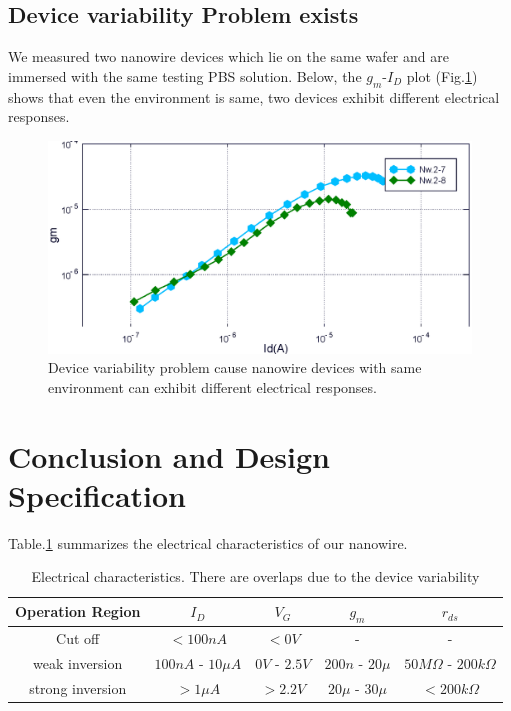 \subsection{Device variability Problem exists}
We measured two nanowire devices which lie on the same wafer and are immersed with the same testing PBS solution.
Below, the $g_m$-$I_D$ plot (Fig.\ref{fig:disparity}) shows that even the environment is same, two devices exhibit different electrical responses.

\begin{figure}[!htb]
    \centering
    \def\svgwidth{width=0.67\textwidth}
    \includegraphics[width=1\textwidth] {images/chapter3/pDisparity.eps}
    \caption{Device variability problem cause nanowire devices with same environment can exhibit different electrical responses.}
    \label{fig:disparity}
\end{figure}


\section{Conclusion and Design Specification} \label{sec:spec3}

Table.\ref{tb:NWcharacter} summarizes the electrical characteristics of our nanowire.
\begin{table}[h!bp]
    {\fontfamily{}\fontsize{10}{14}\selectfont
    \centering
    \begin{tabular}{c|c|c|c|c}
        Operation Region & $I_D$ & $V_G$ & $g_m$ & $r_{ds}$ \\
        \hline
        Cut off & $< 100n A$ & $< 0 V$ & - & - \\
        weak inversion & $100n A$ - $10\mu A$ & $0 V$ - $2.5V$ & $200n $ - $20\mu$ & $50M\Omega$ - $200k\Omega$ \\
        strong inversion & $> 1\mu A$ & $> 2.2V$ & $20\mu$ - $30\mu$ & $< 200k\Omega $ \\
    \end{tabular}
    \caption{Electrical characteristics. There are overlaps due to the device variability}
    \label{tb:NWcharacter}
    }
\end{table}

